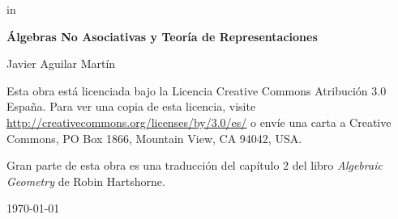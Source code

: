 \documentclass[twoside, 11pt]{report}
\begin{document}
 in

\thispagestyle{empty}

\begin{titlepage}
	\centering
	{\huge\bfseries Álgebras No Asociativas y Teoría de Representaciones \par}
	\vspace{2cm}
	{\Large Javier Aguilar Martín\par}
	\vspace{2.5cm}
	\vfill
	Esta obra está licenciada bajo la Licencia Creative Commons Atribución 3.0 España. Para ver una copia de esta licencia, visite \url{http://creativecommons.org/licenses/by/3.0/es/} o envíe una carta a Creative Commons, PO Box 1866, Mountain View, CA 94042, USA.

Gran parte de esta obra es una traducción del capítulo 2 del libro \emph{Algebraic Geometry} de Robin Hartshorne.

	{\large \today\par}
\end{titlepage}
	


\begin{center}
\end{center}



\setcounter{page}{0}

\tableofcontents




%
%
%
%
%
%
%
%

\end{document}
